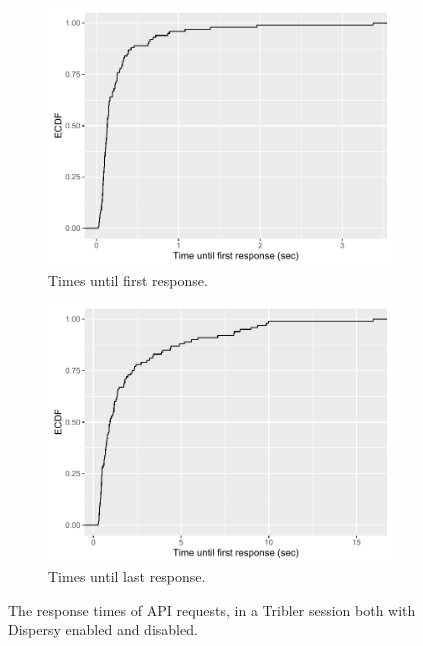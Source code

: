\begin{figure}[h!]
	\centering
	\begin{subfigure}{.5\textwidth}
		\centering
		\includegraphics[width=1.0\linewidth]{images/experiments/remote_search_first_response}
		\caption{Times until first response.}
		\label{fig:remote-search-first-response}
	\end{subfigure}%
	\begin{subfigure}{.5\textwidth}
		\centering
		\includegraphics[width=1.0\linewidth]{images/experiments/remote_search_last_response}
		\caption{Times until last response.}
		\label{fig:remote-search-last-response}
	\end{subfigure}
	\caption{The response times of API requests, in a Tribler session both with Dispersy enabled and disabled.}
	\label{fig:remote-search}
\end{figure}

